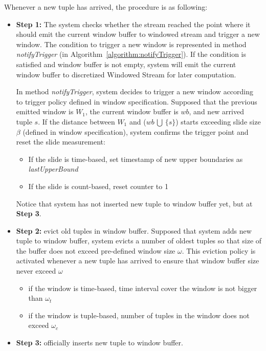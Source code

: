 Whenever a new tuple has arrived, the procedure is as following:
\begin{itemize}
\item \textbf{Step 1:} The system checks whether the stream reached the point where it should emit the current window buffer to windowed stream and trigger a new window. The condition to trigger a new window is represented in method \textit{notifyTrigger} (in Algorithm~\ref{algorithm:notifyTrigger}). If the condition is satisfied and window buffer is not empty, system will emit the current window buffer to discretized Windowed Stream for later computation.  

In method \textit{notifyTrigger}, system decides to trigger a new window according to trigger policy defined in window specification. 
Supposed that the previous emitted window is $W_1$, the current window buffer is $wb$, and new arrived tuple $s$.
If the distance between $W_1$ and ($wb\, \bigcup\, \{s\}$) starts exceeding slide size $\beta$ (defined in window specification), system confirms the trigger point and reset the slide measurement:
\begin{itemize}
\item If the slide is time-based, set timestamp of new upper boundaries as \textit{lastUpperBound}
\item If the slide is count-based, reset counter to 1

\end{itemize}

Notice that system has not inserted new tuple to window buffer yet, but at \textbf{Step 3}.

\item \textbf{Step 2: }evict old tuples in window buffer.
Supposed that system adds new tuple to window buffer, system evicts a number of oldest tuples so that size of the buffer does not exceed pre-defined window size $\omega$. This eviction policy is activated whenever a new tuple has arrived to ensure that window buffer size  never exceed $\omega$
\begin{itemize}
	\item if the window is time-based, time interval cover the window is not bigger than $\omega_t$
	\item if the window is tuple-based, number of tuples in the window does not exceed $\omega_c$
\end{itemize}
\item \textbf{Step 3:} officially inserts new tuple to window buffer.
\end{itemize}

